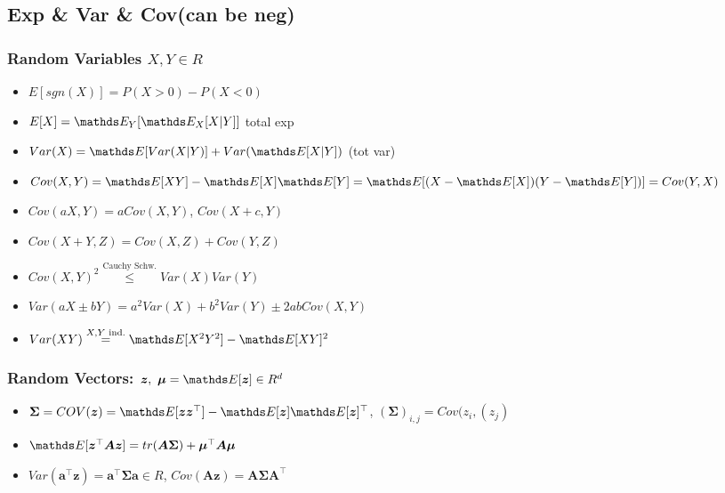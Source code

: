 \subsection{Exp \& Var \& Cov(can be neg)}
\subsubsection{Random Variables $X,Y \in R$} \label{random vars}
\begin{itemize}
    \item $E[sgn(X)] = P(X>0)-P(X<0)$
    \item $E[X] = \E[Y]{\E[X]{X|Y}}$ total exp
    \item $Var(X) = \E {Var(X|Y)} + Var(\E {X|Y})$ (tot var)
    \item $Cov(X,Y) = \E {XY} - \E {X}\E {Y} = \E{(X - \E {X})(Y - \E {Y})} = Cov(Y,X)$
    \item $Cov(aX,Y) = aCov(X,Y)$, $Cov(X +c,Y)$
    \item $Cov(X+Y, Z) = Cov(X,Z) + Cov(Y,Z)$
    \item $Cov(X,Y)^{2} \overset{\text{Cauchy Schw.}}{\leq} Var(X)Var(Y)$
    \item $Var(aX \pm bY) = a^{2}Var(X)+b^{2}Var(Y) \pm 2abCov(X,Y)$
    \item $Var(XY) \overset{X,Y \text{ ind.}}{=} \E {X^{2}Y^{2}} - \E {XY}^{2}$
\end{itemize}
\subsubsection{Random Vectors: $\bm{z},\ \bm{\mu}= \E {\bm{z}} \in R^{d}$}
\begin{itemize}
    \item $\bm{\Sigma} = COV(\bm{z}) = \E {\bm{z}\bm{z}^{\top}} - \E {\bm{z}} \E {\bm{z}}^{\top}$,
    $(\bm{\Sigma})_{i,j} = Cov(z_{i}, (z_{j})$
    \item $\E {\bm{z}^{\top}\bm{A}\bm{z}} = tr(\bm{A}\bm{\Sigma}) + \bm{\mu}^{\top}\bm{A}\bm{\mu}$
    \item $Var(\bm{a}^{\top}\bm{z}) = \bm{a}^{\top}\bm{\Sigma}\bm{a} \in R$, $Cov(\bm{A}\bm{z}) = \bm{A}\bm{\Sigma}\bm{A}^{\top}$
\end{itemize}


